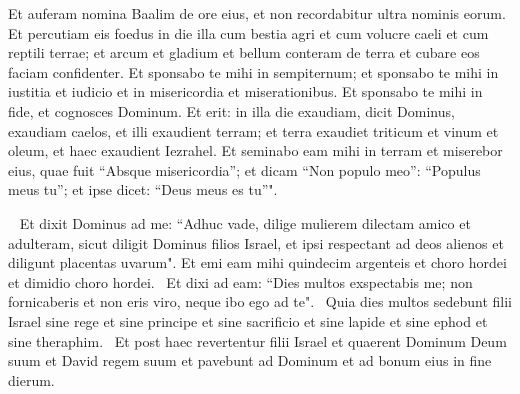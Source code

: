 \begin{biblechapter}
\verse Et auferam nomina Baalim de ore eius, et non recordabitur ultra nominis eorum. 
\verse Et percutiam eis foedus in die illa cum bestia agri et cum volucre caeli et cum reptili terrae; et arcum et gladium et bellum conteram de terra et cubare eos faciam confidenter. 
\verse Et sponsabo te mihi in sempiternum; et sponsabo te mihi in iustitia et iudicio et in misericordia et miserationibus. 
\verse Et sponsabo te mihi in fide, et cognosces Dominum. 
\verse Et erit: in illa die exaudiam, dicit Dominus, exaudiam caelos, et illi exaudient terram; 
\verse et terra exaudiet triticum et vinum et oleum, et haec exaudient Iezrahel. 
\verse Et seminabo eam mihi in terram et miserebor eius, quae fuit “Absque misericordia”; 
\verse et dicam “Non populo meo”: “Populus meus tu”; et ipse dicet: “Deus meus es tu”". 
\end{biblechapter}

\begin{biblechapter}   
\verse Et dixit Dominus ad me: “Adhuc vade, dilige mulierem dilectam amico et adulteram, sicut diligit Dominus filios Israel, et ipsi respectant ad deos alienos et diligunt placentas uvarum". 
\verse Et emi eam mihi quindecim argenteis et choro hordei et dimidio choro hordei.  
\verse Et dixi ad eam: “Dies multos exspectabis me; non fornicaberis et non eris viro, neque ibo ego ad te".  
\verse Quia dies multos sedebunt filii Israel sine rege et sine principe et sine sacrificio et sine lapide et sine ephod et sine theraphim.  
\verse Et post haec revertentur filii Israel et quaerent Dominum Deum suum et David regem suum et pavebunt ad Dominum et ad bonum eius in fine dierum. 
\end{biblechapter}

